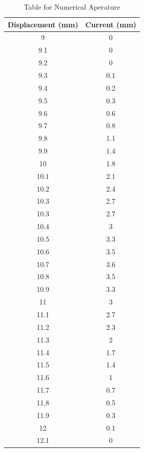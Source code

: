     \begin{table}[htbp]
         \centering
        \begin{tabular}{|c|c|}
             \hline
             \textbf{Displacement (mm)} & \textbf{Current (mm)} \\
             \hline
                9 & 0 \\
                9.1 & 0 \\
                9.2 & 0 \\
                9.3 & 0.1 \\
                9.4 & 0.2 \\
                9.5 & 0.3 \\
                9.6 & 0.6 \\
                9.7 & 0.8 \\
                9.8 & 1.1 \\
                9.9 & 1.4 \\
                10 & 1.8 \\
                10.1 & 2.1 \\
                10.2 & 2.4 \\
                10.3 & 2.7 \\
                10.3 & 2.7 \\
                10.4&	3 \\ 
                10.5&	3.3 \\ 
                10.6&	3.5 \\
                10.7&	3.6 \\
                10.8&	3.5 \\
                10.9&	3.3 \\
                11	&3 \\
                11.1&	2.7 \\
                11.2&	2.3 \\
                11.3&	2 \\
                11.4&	1.7 \\
                11.5&	1.4 \\
                11.6&	1 \\
                11.7&	0.7 \\
                11.8&	0.5 \\
                11.9&	0.3 \\
                12	&0.1 \\
                12.1&	0 \\
            \hline
        \end{tabular}
        \caption{Table for Numerical Aperature}
    \end{table}
